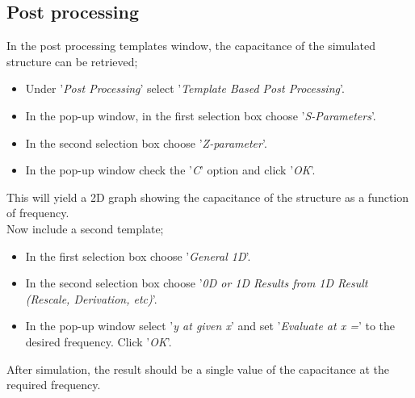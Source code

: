 \subsection{Post processing}
In the post processing templates window, the capacitance of the simulated structure can be retrieved; 
\begin{itemize}
	\item Under '\textit{Post Processing}' select '\textit{Template Based Post Processing}'.
	\item In the pop-up window, in the first selection box choose '\textit{S-Parameters}'.
	\item In the second selection box choose '\textit{Z-parameter}'.
	\item In the pop-up window check the '\textit{C}' option and click '\textit{OK}'.
\end{itemize}
This will yield a 2D graph showing the capacitance of the structure as a function of frequency. \\
Now include a second template;
\begin{itemize}
	\item In the first selection box choose '\textit{General 1D}'.
	\item In the second selection box choose '\textit{0D or 1D Results from 1D Result (Rescale, Derivation, etc)}'.
	\item In the pop-up window select '\textit{y at given x}' and set '\textit{Evaluate at x =}' to the desired frequency. Click '\textit{OK}'.
\end{itemize}
After simulation, the result should be a single value of the capacitance at the required frequency.

